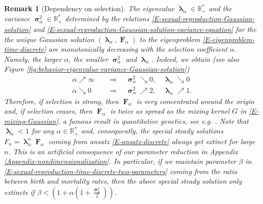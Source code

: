\documentclass[reqno]{amsart}
\newtheorem{remark}[definition]{Remark}
\DeclareMathOperator{\blambda}{\boldsymbol{\lambda}}
\DeclareMathOperator{\bsigma}{\boldsymbol{\sigma}}
\DeclareMathOperator{\bF}{\boldsymbol{F}}
\numberwithin{equation}{section}
\begin{document}
{\begin{remark}[Dependency on selection]\label{R-sexual-reproduction-Gaussian-solution-variance}
The eigenvalue $\blambda_\alpha\in \mathbb{R}_+^*$ and the variance $\bsigma_\alpha^2\in \mathbb{R}_+^*$ determined by the relations \eqref{E-sexual-reproduction-Gaussian-solution} and \eqref{E-sexual-reproduction-Gaussian-solution-variance-equation} for the the unique Gaussian solution $(\blambda_\alpha,\bF_\alpha)$ to the eigenproblem \eqref{E-eigenproblem-time-discrete} are monotonically decreasing with the selection coefficient $\alpha$. Namely, the larger $\alpha$, the smaller $\bsigma_\alpha^2$ and $\blambda_\alpha$. Indeed, we obtain (see also Figure \ref{fig:behavior-eigenvalue-variance-Gaussian-solution})
\begin{align*}
\alpha \nearrow \infty \quad &\Longrightarrow\quad \bsigma_\alpha^2 \searrow 0,\quad \blambda_\alpha \searrow 0\\
\alpha \searrow 0 \quad &\Longrightarrow\quad \bsigma_\alpha^2 \nearrow 2,\quad \blambda_\alpha\nearrow 1.
\end{align*}
Therefore, if selection is strong, then $\bF_\alpha$ is very concentrated around the origin and, if selection ceases, then $\bF_\alpha$ is twice as spread as the mixing kernel $G$ in \eqref{E-mixing-Gaussian}, a famous result in quantitative genetics, see {\em e.g.} \cite{B-80}. Note that $\blambda_\alpha< 1$ for any $\alpha\in \mathbb{R}_+^*$ and, consequently, the special steady solutions $F_n=\blambda_\alpha^n \bF_\alpha$ coming from ansatz \eqref{E-ansatz-discrete} always get extinct for large $n$. This is an artificial consequence of our parameter reduction in Appendix \ref{Appendix-nondimensionalization}. In particular, if we maintain parameter $\beta$ in \eqref{E-sexual-reproduction-time-discrete-two-parameters} coming from the ratio between birth and mortality rates, then the above special steady solution only extincts if $\beta<(1+\alpha(1+\frac{\bsigma_\alpha^2}{2}))$.
\end{remark}

}
\end{document}
